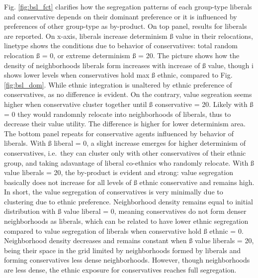 \documentclass[
]{article}
\begin{document}
Fig. \ref{fig:bsl_fct} clarifies how the segregation patterns of each
group-type liberals and conservative depends on their dominant
preference or it is influenced by preferences of other group-type as
by-product. On top panel, results for liberals are reported. On x-axis,
liberals increase determinism ß value in their relocations, linetype
shows the conditions due to behavior of conservatives: total random
relocation ß = 0, or extreme determinism ß = 20. The picture shows how
the density of neighborhoods liberals form increases with increase of ß
value, though i shows lower levels when conservatives hold max ß ethnic,
compared to Fig. \ref{fig:bsl_dom}. While ethnic integration is
unaltered by ethnic preference of conservatives, as no difference is
evident. On the contrary, value segreation seems higher when
conservative cluster together until ß conservative = 20. Likely with ß =
0 they would randomnly relocate into neighborhoods of liberals, thus to
decrease their value utility. The difference is higher for lower
determinism area. The bottom panel repeats for conservative agents
influenced by behavior of liberals. With ß liberal = 0, a slight
increase emerges for higher determinism of conservatives, i.e.~they can
cluster only with other conservatives of their ethnic group, and taking
adavantage of liberal co-ethnics who randomly relocate. With ß value
liberals = 20, the by-product is evident and strong: value segregation
basically does not increase for all levels of ß ethnic conservative and
remains high. In short, the value segregation of conservatives is very
minimally due to clustering due to ethnic preference. Neighborhood
density remains equal to initial distribution with ß value liberal = 0,
meaning conservatives do not form denser neighborhoods as liberals,
which can be related to have lower ethnic segregation compared to value
segregation of liberals when conservative hold ß ethnic = 0.
Neighborhood density decreases and remains constant when ß value
liberals = 20, being their space in the grid limited by neighborhoods
formed by liberals and forming conservatives less dense neighborhoods.
However, though neighborhoods are less dense, the ethnic exposure for
conservatives reaches full segregation.
\end{document}
